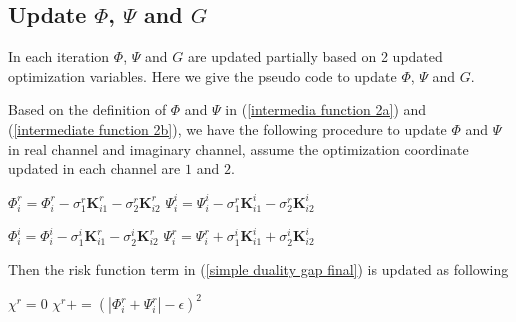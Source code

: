 \documentclass[12pt, draftclsnofoot, onecolumn]{IEEEtran}
\begin{document}
\begin{spacing}{2}
\subsection{Update $\Phi$, $\Psi$ and $G$}
In each iteration $\Phi$, $\Psi$ and $G$ are updated partially based on 2 updated optimization variables. Here we give the pseudo code to update $\Phi$, $\Psi$ and $G$.

Based on the definition of $\Phi$ and $\Psi$ in (\ref{intermedia function 2a}) and (\ref{intermediate function 2b}), we have the following procedure to update $\Phi$ and $\Psi$ in real channel and imaginary channel, assume the optimization coordinate updated in each channel are $1$ and $2$.\\
\begin{algorithm}[htb]
\begin{algorithmic}
\State $\Phi_{i}^{r}=\Phi_{i}^{r}-\sigma_{1}^{r}\mathbf{K}^{r}_{i1}-\sigma_{2}^{r}\mathbf{K}_{i2}^{r}$
\State $\Psi_{i}^{i}=\Psi_{i}^{i}-\sigma_{1}^{r}\mathbf{K}^{i}_{i1}-\sigma_{2}^{r}\mathbf{K}^{i}_{i2}$
\EndFor
\EndProcedure
\end{algorithmic}
\end{algorithm}
\begin{algorithm}[htb]
\begin{algorithmic}
\State $\Phi_{i}^{i}=\Phi_{i}^{i}-\sigma_{1}^{i}\mathbf{K}^{r}_{i1}-\sigma_{2}^{i}\mathbf{K}_{i2}^{r}$
\State $\Psi_{i}^{r}=\Psi_{i}^{r}+\sigma_{1}^{i}\mathbf{K}^{i}_{i1}+\sigma_{2}^{i}\mathbf{K}^{i}_{i2}$
\EndFor
\EndProcedure
\end{algorithmic}
\end{algorithm}

Then the risk function term in (\ref{simple duality gap final}) is updated as following
\begin{algorithm}[htb]
\begin{algorithmic}
\State $\chi^{r}=0$  
\State $\chi^{r}+=(|\Phi^{r}_{i}+\Psi^{r}_{i}|-\epsilon)^{2}$
\EndIf
\EndFor
\EndProcedure
\end{algorithmic}
\end{algorithm}


\end{spacing}
\end{document}
